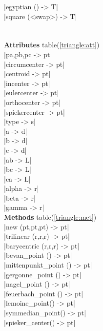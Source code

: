 \documentclass[DIV         = 14,
               fontsize    = 10,
               index       = totoc,
               twoside,
               cadre,
               headings    = small
               ]{tkz-doc}
\begin{document}
\begin{multicols}{3}
|egyptian ()               -> T|   \\
|square (<swap>)           -> T|   \\
                                   \\
           \\
\textbf{Attributes} table(\ref{triangle:att})      \\
|pa,pb,pc                  -> pt|  \\
|circumcenter              -> pt|  \\
|centroid                  -> pt|  \\
|incenter                  -> pt|  \\
|eulercenter               -> pt|  \\
|orthocenter               -> pt|  \\
|spiekercenter             -> pt|  \\
|type                      -> s|   \\
|a                         -> d|   \\
|b                         -> d|   \\
|c                         -> d|   \\
|ab                        -> L|   \\
|bc                        -> L|   \\
|ca                        -> L|   \\
|alpha                     -> r|   \\
|beta                      -> r|   \\
|gamma                     -> r|   \\
\textbf{Methods} table(\ref{triangle:met}) \\
|new (pt,pt,pt)            -> pt|  \\
|trilinear (r,r,r)         -> pt|  \\
|barycentric (r,r,r)       -> pt|  \\
|bevan_point ()            -> pt|  \\
|mittenpunkt_point ()      -> pt|  \\
|gergonne_point ()         -> pt|  \\
|nagel_point ()            -> pt|  \\
|feuerbach_point ()        -> pt|  \\
|lemoine_point()           -> pt|  \\
|symmedian_point()         -> pt|  \\
|spieker_center()          -> pt|  \\

\end{multicols}
\end{document}
